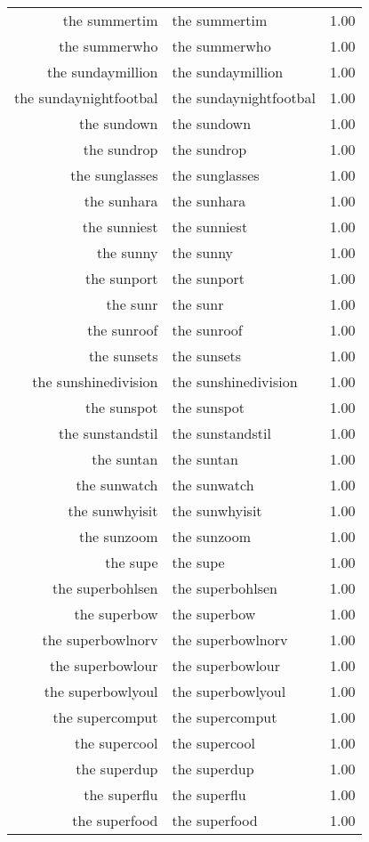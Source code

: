 \begin{table}[ht]
\begin{tabular}{rlr}
  the summertim & the summertim & 1.00 \\ 
  the summerwho & the summerwho & 1.00 \\ 
  the sundaymillion & the sundaymillion & 1.00 \\ 
  the sundaynightfootbal & the sundaynightfootbal & 1.00 \\ 
  the sundown & the sundown & 1.00 \\ 
  the sundrop & the sundrop & 1.00 \\ 
  the sunglasses & the sunglasses & 1.00 \\ 
  the sunhara & the sunhara & 1.00 \\ 
  the sunniest & the sunniest & 1.00 \\ 
  the sunny & the sunny & 1.00 \\ 
  the sunport & the sunport & 1.00 \\ 
  the sunr & the sunr & 1.00 \\ 
  the sunroof & the sunroof & 1.00 \\ 
  the sunsets & the sunsets & 1.00 \\ 
  the sunshinedivision & the sunshinedivision & 1.00 \\ 
  the sunspot & the sunspot & 1.00 \\ 
  the sunstandstil & the sunstandstil & 1.00 \\ 
  the suntan & the suntan & 1.00 \\ 
  the sunwatch & the sunwatch & 1.00 \\ 
  the sunwhyisit & the sunwhyisit & 1.00 \\ 
  the sunzoom & the sunzoom & 1.00 \\ 
  the supe & the supe & 1.00 \\ 
  the superbohlsen & the superbohlsen & 1.00 \\ 
  the superbow & the superbow & 1.00 \\ 
  the superbowlnorv & the superbowlnorv & 1.00 \\ 
  the superbowlour & the superbowlour & 1.00 \\ 
  the superbowlyoul & the superbowlyoul & 1.00 \\ 
  the supercomput & the supercomput & 1.00 \\ 
  the supercool & the supercool & 1.00 \\ 
  the superdup & the superdup & 1.00 \\ 
  the superflu & the superflu & 1.00 \\ 
  the superfood & the superfood & 1.00 \\ 

\end{tabular}
\end{table}
